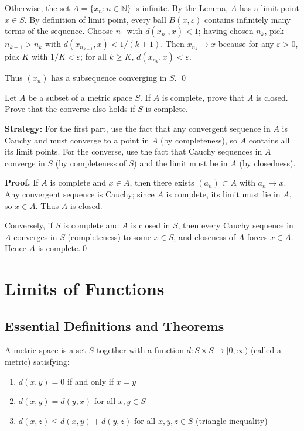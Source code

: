 Otherwise, the set \(A=\{x_n:n\in\mathbb{N}\}\) is infinite. By the Lemma, \(A\) has a limit point \(x\in S\). By definition of limit point, every ball \(B(x,\varepsilon)\) contains infinitely many terms of the sequence. Choose \(n_1\) with \(d(x_{n_1},x)<1\); having chosen \(n_k\), pick \(n_{k+1}>n_k\) with \(d(x_{n_{k+1}},x)<1/(k+1)\). Then \(x_{n_k}\to x\) because for any \(\varepsilon>0\), pick \(K\) with \(1/K<\varepsilon\); for all \(k\ge K\), \(d(x_{n_k},x)<\varepsilon\).

Thus \((x_n)\) has a subsequence converging in \(S\). \qed
\medskip



\begin{problembox}
\begin{problemstatement}
Let $A$ be a subset of a metric space $S$. If $A$ is complete, prove that $A$ is closed. Prove that the converse also holds if $S$ is complete.
\end{problemstatement}
\end{problembox}

\noindent\textbf{Strategy:} For the first part, use the fact that any convergent sequence in $A$ is Cauchy and must converge to a point in $A$ (by completeness), so $A$ contains all its limit points. For the converse, use the fact that Cauchy sequences in $A$ converge in $S$ (by completeness of $S$) and the limit must be in $A$ (by closedness).

\noindent\textbf{Proof.}
If $A$ is complete and $x\in\overline{A}$, then there exists $(a_n)\subset A$ with $a_n\to x$. Any convergent sequence is Cauchy; since $A$ is complete, its limit must lie in $A$, so $x\in A$. Thus $A$ is closed.

Conversely, if $S$ is complete and $A$ is closed in $S$, then every Cauchy sequence in $A$ converges in $S$ (completeness) to some $x\in S$, and closeness of $A$ forces $x\in A$. Hence $A$ is complete.\qed
\medskip

\section{Limits of Functions}

\subsection*{Essential Definitions and Theorems}

\begin{definition}
A metric space is a set $S$ together with a function $d: S \times S \to [0,\infty)$ (called a metric) satisfying:
\begin{enumerate}
\item $d(x,y) = 0$ if and only if $x = y$
\item $d(x,y) = d(y,x)$ for all $x,y \in S$
\item $d(x,z) \leq d(x,y) + d(y,z)$ for all $x,y,z \in S$ (triangle inequality)
\end{enumerate}
\end{definition}

